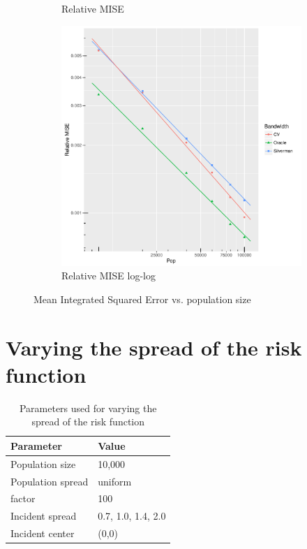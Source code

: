 \begin{figure}[htbp]
\begin{subfigure}[b]{0.3\textwidth}
    \caption{Relative MISE}
    \end{subfigure}
    \begin{subfigure}[b]{0.3\textwidth}
    \includegraphics[width=\textwidth]{results/by_pop_size/RMISE-vs-population-log-log}
    \caption{Relative MISE log-log}
    \end{subfigure}
    \caption[MISE: by population size]{Mean Integrated Squared Error vs. population size}
    \label{fig:ise:unifNpop_1h}
\end{figure}


\section{Varying the spread of the risk function}
\label{sec:results:unif_100_SD}

\begin{table}[htbp]
\centering
\begin{tabular}{ll}
\hline
Parameter & Value \\
\hline
Population size & 10,000 \\
Population \gls{spread} & uniform \\
\Gls{factor} & 100 \\
Incident \gls{spread} & 0.7, 1.0, 1.4, 2.0 \\
Incident center & (0,0) \\
\hline
\end{tabular}
\caption{Parameters used for varying the \gls{spread} of the risk function}
\label{tab:params:unif_100_SD}
\end{table}

